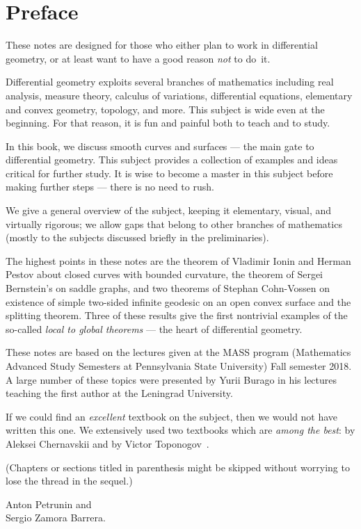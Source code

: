 
\chapter*{Preface}

These notes are designed for those who either plan to work in differential geometry,
or at least want to have a good reason \emph{not} to do~it.

Differential geometry exploits several branches of mathematics including 
real analysis, 
measure theory,
calculus of variations,
differential equations,
elementary and convex geometry,
topology, and more.
This subject is wide even at the beginning. 
For that reason, it is fun and painful both to teach and to study.

In this book, we discuss smooth curves and surfaces --- the main gate to differential geometry.
This subject provides a collection of examples and ideas critical for further study.
It is wise to become a master in this subject before making further steps --- there is no need to rush.

We give a general overview of the subject, keeping it elementary, visual, and virtually rigorous; we allow gaps that belong to other branches of mathematics (mostly to the subjects discussed briefly in the preliminaries).

The highest points in these notes are
the theorem of Vladimir Ionin and Herman Pestov about closed curves with bounded curvature,
the theorem of Sergei Bernstein's on saddle graphs,
and two theorems of Stephan Cohn-Vossen on existence of simple two-sided infinite geodesic on an open convex surface and the splitting theorem.
Three of these results give the first nontrivial examples of the so-called {}\emph{local to global theorems} --- the heart of differential geometry.

These notes are based on the lectures given at the MASS program (Mathematics Advanced Study Semesters at Pennsylvania State University) Fall semester 2018.
A large number of these topics were presented by Yurii Burago in his lectures teaching the first author at the Leningrad University.

If we could find an \emph{excellent} textbook on the subject, then we would not have written this one.
We extensively used two textbooks which are \emph{among the best}: by Aleksei Chernavskii \cite{chernavsky} and by Victor Toponogov~\cite{toponogov-book}.

(Chapters or sections titled in parenthesis might be skipped without worrying to lose the thread in the sequel.)

\begin{flushright}
Anton Petrunin and\\
Sergio Zamora Barrera.
\end{flushright}



\newpage
\tableofcontents
